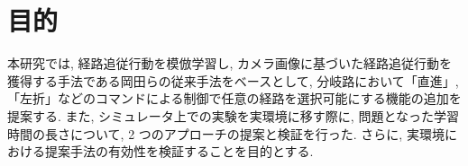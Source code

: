 
\section{目的}
本研究では, 経路追従行動を模倣学習し, カメラ画像に基づいた経路追従行動を獲得する手法である岡田らの従来手法をベースとして, 分岐路において「直進」, 「左折」などのコマンドによる制御で任意の経路を選択可能にする機能の追加を提案する. また, シミュレータ上での実験を実環境に移す際に, 問題となった学習時間の長さについて, 2 つのアプローチの提案と検証を行った. さらに, 実環境における提案手法の有効性を検証することを目的とする.


